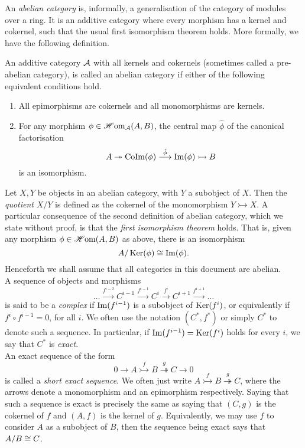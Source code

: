 \documentclass[a4paper]{article}
\def\mono{\rightarrowtail}
\def\epi{\twoheadrightarrow}
\begin{document}
An \emph{abelian category} is, informally, a generalisation of the category of modules over a ring. It is an additive category where every morphism has a kernel and cokernel, such that the usual first isomorphism theorem holds. More formally, we have the following definition.
\begin{Definition}
    An additive category $\mathcal{A}$ with all kernels and cokernels (sometimes called a pre-abelian category), is called an abelian category if either of the following equivalent conditions hold.
    \begin{enumerate}
        \item All epimorphisms are cokernels and all monomorphisms are kernels.
        \item For any morphism $\phi\in \operatorname{\mathscr{H}om}_{\mathcal{A}}(A,B)$, the central map $\hat{\phi}$ of the canonical factorisation
            \[
                A \epi \CoIm(\phi) \stackrel{\hat{\phi}}{\to} \im(\phi) \mono B
            \]
            is an isomorphism.
    \end{enumerate}
\end{Definition}
Let $X,Y$ be objects in an abelian category, with $Y$ a subobject of $X$. Then the \emph{quotient} $X/Y$ is defined as the cokernel of the monomorphism $Y\mono X$. A particular consequence of the second definition of abelian category, which we state without proof, is that the \emph{first isomorphism theorem} holds. That is, given any morphism $\phi \in \operatorname{\mathscr{H}om}(A,B)$ as above, there is an isomorphism
\[
    A/\operatorname{Ker}(\phi) \cong \operatorname{Im}(\phi).
\]
Henceforth we shall assume that all categories in this document are abelian.\\


A sequence of objects and morphisms
\[
    \dots \stackrel{f^{i-2}}{\to} C^{i-1} \stackrel{f^{i-1}}{\to} C^{i} \stackrel{f^{i}}{\to} C^{i+1} \stackrel{f^{i+1}}{\to} \dots
\]
is said to be a \emph{complex} if $\operatorname{Im}(f^{i-1})$ is a subobject of $\operatorname{Ker}(f^i)$, or equivalently if $f^{i} \circ f^{i-1} = 0$, for all $i$. We often use the notation $(C^*, f^*)$ or simply $C^*$ to denote such a sequence. In particular, if $\operatorname{Im}(f^{i-1}) = \operatorname{Ker}(f^i)$ holds for every $i$, we say that $C^*$ is \emph{exact}.\\

An exact sequence of the form
\[
    0 \to A \stackrel{f}{\mono} B \stackrel{g}{\epi} C \to 0
\]
is called a \emph{short exact sequence}. We often just write $A \stackrel{f}{\mono} B \stackrel{g}{\epi} C$, where the arrows denote a monomorphism and an epimorphism respectively. Saying that such a sequence is exact is precisely the same as saying that $(C,g)$ is the cokernel of $f$ and $(A,f)$ is the kernel of $g$. Equivalently, we may use $f$ to consider $A$ as a subobject of $B$, then the sequence being exact says that $A/B \cong C$.\\
\end{document}
